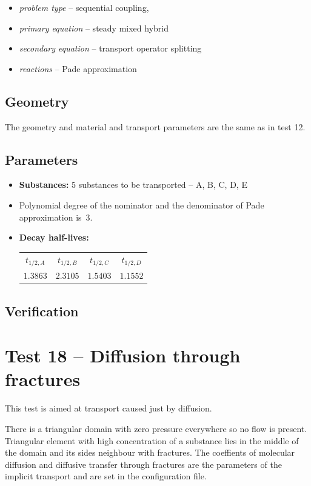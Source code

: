 \begin{itemize} 
    \item \emph{problem type} -- sequential coupling, 
    \item \emph{primary equation} -- steady mixed hybrid
    \item \emph{secondary equation} -- transport operator splitting
    \item \emph{reactions} -- Pade approximation
  \end{itemize}

\subsection*{Geometry}
The geometry and material and transport parameters are the same as in test 12.


\subsection*{Parameters}
\begin{itemize}
  \item \textbf{Substances:} 5 substances to be transported -- A, B, C, D, E
  \item Polynomial degree of the nominator and the denominator of Pade approximation is~3.
  \item \textbf{Decay half-lives:} 
    \begin{tabular}[c]{|c|c|c|c|}
      \hline
      $t_{1/2,A}$ & $t_{1/2,B}$  & $t_{1/2,C}$ & $t_{1/2,D}$\\[4pt]
      $1.3863$ & $2.3105$ & $1.5403$ & $1.1552$\\[4pt]
      \hline
    \end{tabular}
\end{itemize}

\subsection*{Verification}



\section{Test 18 -- Diffusion through fractures}
This test is aimed at transport caused just by diffusion. 

There is a triangular domain with zero pressure everywhere so no flow is present. Triangular element 
with high concentration of a substance lies in the middle of the domain and its sides neighbour with fractures.
The coeffients of molecular diffusion and diffusive transfer through fractures are the parameters of 
the implicit transport and are set in the configuration file.

